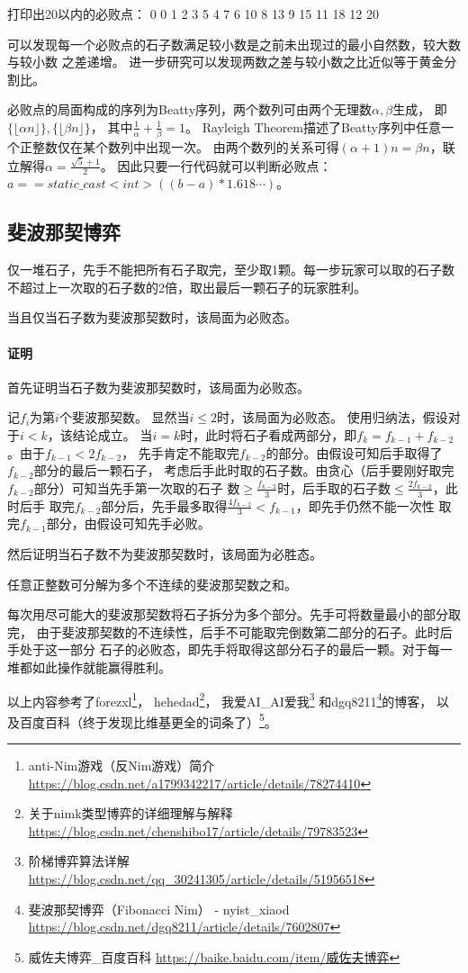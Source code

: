 打印出20以内的必败点：
0 0
1 2
3 5
4 7
6 10
8 13
9 15
11 18
12 20

可以发现每一个必败点的石子数满足较小数是之前未出现过的最小自然数，较大数与较小数
之差递增。
进一步研究可以发现两数之差与较小数之比近似等于黄金分割比。

必败点的局面构成的序列为Beatty序列，两个数列可由两个无理数$\alpha,\beta$生成，
即$\{\lfloor\alpha n\rfloor\},\{\lfloor\beta n\rfloor\}$，
其中$\frac{1}{\alpha}+\frac{1}{\beta}=1$。
Rayleigh Theorem描述了Beatty序列中任意一个正整数仅在某个数列中出现一次。
由两个数列的关系可得$(\alpha+1)n=\beta n$，联立解得$\alpha=\frac{\sqrt{5}+1}{2}$。
因此只要一行代码就可以判断必败点：$a==static\_cast<int>((b-a)*1.618\cdots)$。

\subsection{斐波那契博弈}
仅一堆石子，先手不能把所有石子取完，至少取1颗。每一步玩家可以取的石子数
不超过上一次取的石子数的2倍，取出最后一颗石子的玩家胜利。

\begin{theorem}
	当且仅当石子数为斐波那契数时，该局面为必败态。
\end{theorem}

\paragraph{证明}
首先证明当石子数为斐波那契数时，该局面为必败态。

记$f_i$为第$i$个斐波那契数。
显然当$i\leq 2$时，该局面为必败态。
使用归纳法，假设对于$i<k$，该结论成立。
当$i=k$时，此时将石子看成两部分，即$f_k=f_{k-1}+f_{k-2}$。由于$f_{k-1}<2f_{k-2}$，
先手肯定不能取完$f_{k-2}$的部分。由假设可知后手取得了$f_{k-2}$部分的最后一颗石子，
考虑后手此时取的石子数。由贪心（后手要刚好取完$f_{k-2}$部分）可知当先手第一次取的石子
数$\geq \frac{f_{k-2}}{3}$时，后手取的石子数$\leq \frac{2f_{k-2}}{3}$，此时后手
取完$f_{k-2}$部分后，先手最多取得$\frac{4f_{k-2}}{3}<f_{k-1}$，即先手仍然不能一次性
取完$f_{k-1}$部分，由假设可知先手必败。

然后证明当石子数不为斐波那契数时，该局面为必胜态。
\begin{lemma}
	任意正整数可分解为多个不连续的斐波那契数之和。
\end{lemma}
每次用尽可能大的斐波那契数将石子拆分为多个部分。先手可将数量最小的部分取完，
由于斐波那契数的不连续性，后手不可能取完倒数第二部分的石子。此时后手处于这一部分
石子的必败态，即先手将取得这部分石子的最后一颗。对于每一堆都如此操作就能赢得胜利。

以上内容参考了forezxl\footnote{anti-Nim游戏（反Nim游戏）简介
	\url{https://blog.csdn.net/a1799342217/article/details/78274410}}，
hehedad\footnote{关于nimk类型博弈的详细理解与解释
	\url{https://blog.csdn.net/chenshibo17/article/details/79783523}}，
我爱AI\_AI爱我\footnote{阶梯博弈算法详解
	\url{https://blog.csdn.net/qq\_30241305/article/details/51956518}}
和dgq8211\footnote{
	斐波那契博弈（Fibonacci Nim） - nyist\_xiaod
	\url{https://blog.csdn.net/dgq8211/article/details/7602807}
}的博客，
以及百度百科（终于发现比维基更全的词条了）\footnote{
	威佐夫博弈\_百度百科
	\url{https://baike.baidu.com/item/威佐夫博弈}
}。
